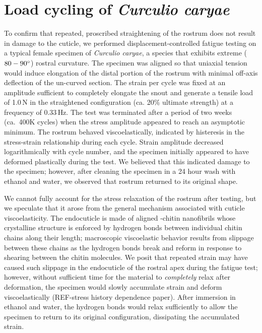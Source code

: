 \documentclass[twocolumn, linenumbers, superscriptaddress, nofootinbib]{revtex4-1}
\begin{document}
	\section{Load cycling of \textit{Curculio caryae}}
		To confirm that repeated, proscribed straightening of the rostrum does not result in damage to the cuticle, we performed displacement-controlled fatigue testing on a typical female specimen of \textit{Curculio caryae}, a species that exhibits extreme ($80-90\degree$) rostral curvature.
		The specimen was aligned so that uniaxial tension would induce elongation of the distal portion of the rostrum with minimal off-axis deflection of the un-curved section.
		The strain per cycle was fixed at an amplitude sufficient to completely elongate the snout and generate a tensile load of 1.0\,N  in the straightened configuration (ca. 20\% ultimate strength) at a frequency of $0.33\,\text{Hz}$.
		The test was terminated after a period of two weeks (ca.~400K cycles) when the stress amplitude appeared to reach an asymptotic minimum.		
		The rostrum behaved viscoelastically, indicated by histeresis in the stress-strain relationship during each cycle.
		Strain amplitude decreased logarithmically with cycle number, and the specimen initially appeared to have deformed plastically during the test.
		We believed that this indicated damage to the specimen; however, after cleaning the specimen in a 24 hour wash with ethanol and water, we observed that rostrum returned to its original shape.
		
		We cannot fully account for the stress relaxation of the rostrum after testing, but we speculate that it arose from the general mechanism associated with cuticle viscoelasticity.
		The endocuticle is made of aligned \textalpha-chitin nanofibrils whose crystalline structure is enforced by hydrogen bonds between individual chitin chains along their length; macroscopic viscoelastic behavior results from slippage between these chains as the hydrogen bonds break and reform in response to shearing between the chitin molecules.
		We posit that repeated strain may have caused such slippage in the endocuticle of the rostral apex during the fatigue test; however, without sufficient time for the material to \textit{completely} relax after deformation, the specimen would slowly accumulate strain and deform viscoelastically (REF-stress history dependence paper).
		After immersion in ethanol and water, the hydrogen bonds would relax sufficiently to allow the specimen to return to its original configuration, dissipating the accumulated strain.
		
\end{document}
